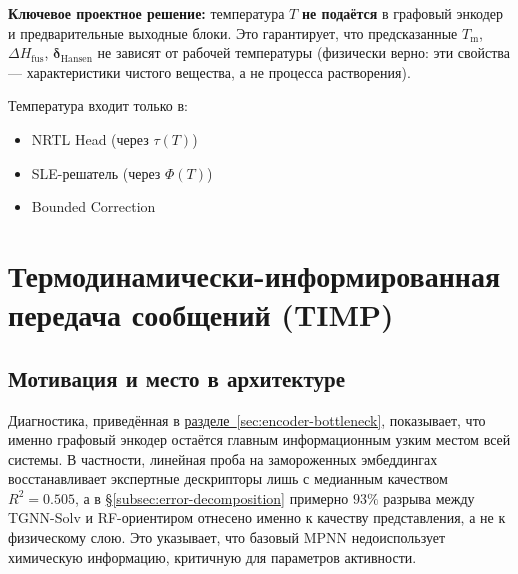 \documentclass[11pt]{article}
\begin{document}
\textbf{Ключевое проектное решение:} температура $T$ \textbf{не подаётся} в графовый энкодер и предварительные выходные блоки. Это гарантирует, что предсказанные $T_{\mathrm{m}}$, $\Delta H_{\mathrm{fus}}$, $\boldsymbol{\delta}_{\mathrm{Hansen}}$ не зависят от рабочей температуры (физически верно: эти свойства --- характеристики чистого вещества, а не процесса растворения).

Температура входит только в:
\begin{itemize}
  \item NRTL Head (через $\tau(T)$)
  \item SLE-решатель (через $\Phi(T)$)
  \item Bounded Correction
\end{itemize}

\section{Термодинамически-информированная передача сообщений (TIMP)}
\label{sec:timp}

\subsection{Мотивация и место в архитектуре}

Диагностика, приведённая в \hyperref[sec:encoder-bottleneck]{разделе~\ref*{sec:encoder-bottleneck}}, показывает, что именно графовый энкодер остаётся главным информационным узким местом всей системы. В частности, линейная проба на замороженных эмбеддингах восстанавливает экспертные дескрипторы лишь с медианным качеством $R^2 = 0.505$, а в \hyperref[subsec:error-decomposition]{§\ref*{subsec:error-decomposition}} примерно $93\%$ разрыва между TGNN-Solv и RF-ориентиром отнесено именно к качеству представления, а не к физическому слою. Это указывает, что базовый MPNN недоиспользует химическую информацию, критичную для параметров активности.
\end{document}
